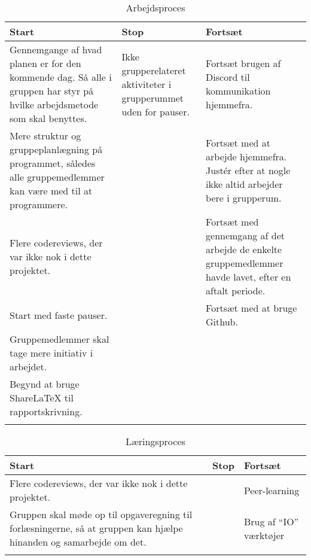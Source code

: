 \setlength{\LTleft}{-20cm plus -1fill}
\setlength{\LTright}{\LTleft}
\begin{longtable}{| p{} | p{} | p{} |}
\hline
\textbf{Start}		& \textbf{Stop}		& \textbf{Fortsæt} \\ \hline
Gennemgange af hvad planen er for den kommende dag. Så alle i gruppen har styr på hvilke arbejdsmetode som skal benyttes. & Ikke grupperelateret aktiviteter i grupperummet uden for pauser. & Fortsæt brugen af Discord til kommunikation hjemmefra. \\ \hline
Mere struktur og gruppeplanlægning på programmet, således alle gruppemedlemmer kan være med til at programmere. &  & Fortsæt med at arbejde hjemmefra. Justér efter at nogle ikke altid arbejder bere i grupperum. \\ \hline
Flere codereviews, der var ikke nok i dette projektet.  &  & Fortsæt med gennemgang af det arbejde de enkelte gruppemedlemmer havde lavet, efter en aftalt periode. \\ \hline
Start med faste pauser.  &  & Fortsæt med at bruge Github.  \\ \hline
Gruppemedlemmer skal tage mere initiativ i arbejdet.  &  &  \\ \hline
Begynd at bruge ShareLaTeX til rapportskrivning.  &  &  \\ \hline
\caption{Arbejdsproces}\label{ArbejdsprocesSSF}
\end{longtable}

\setlength{\LTleft}{-20cm plus -1fill}
\setlength{\LTright}{\LTleft}
\begin{longtable}{| p{} | p{} | p{} |}
\hline
\textbf{Start}                                                                                                     & \textbf{Stop} & \textbf{Fortsæt}       \\ \hline
Flere codereviews, der var ikke nok i dette projektet.                                                             &               & Peer-learning          \\ \hline
Gruppen skal møde op til opgaveregning til forlæsningerne, så at gruppen kan hjælpe hinanden og samarbejde om det. &               & Brug af “IO” værktøjer \\ \hline
\caption{Læringsproces}\label{LaeringsprocesSSF}
\end{longtable}

\newpage

